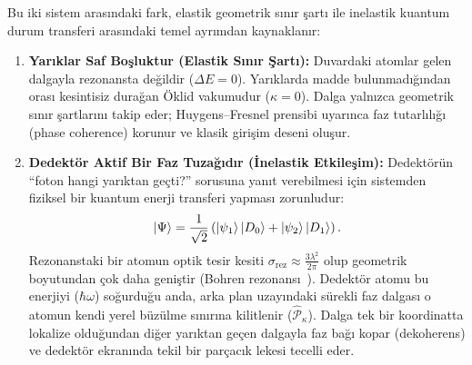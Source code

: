 \documentclass[11pt,a4paper]{article}
\begin{document}
Bu iki sistem arasındaki fark, elastik geometrik sınır şartı ile inelastik kuantum durum transferi arasındaki temel ayrımdan kaynaklanır:
\begin{enumerate}
    \item \textbf{Yarıklar Saf Boşluktur (Elastik Sınır Şartı):} Duvardaki atomlar gelen dalgayla rezonansta değildir ($\Delta E = 0$). Yarıklarda madde bulunmadığından orası kesintisiz durağan Öklid vakumudur ($\kappa = 0$). Dalga yalnızca geometrik sınır şartlarını takip eder; Huygens--Fresnel prensibi uyarınca faz tutarlılığı (phase coherence) korunur ve klasik girişim deseni oluşur.
    \item \textbf{Dedektör Aktif Bir Faz Tuzağıdır (İnelastik Etkileşim):} Dedektörün ``foton hangi yarıktan geçti?'' sorusuna yanıt verebilmesi için sistemden fiziksel bir kuantum enerji transferi yapması zorunludur:
          \begin{equation}
              \ket{\Psi} = \frac{1}{\sqrt{2}} \left( \ket{\psi_1}\ket{D_0} + \ket{\psi_2}\ket{D_1} \right).
              \label{eq:dolanik_olcum_em}
          \end{equation}
          Rezonanstaki bir atomun optik tesir kesiti $\sigma_{\mathrm{rez}} \approx \frac{3\lambda^2}{2\pi}$ olup geometrik boyutundan çok daha geniştir (Bohren rezonansı~\cite{bohren1983,paul1982}). Dedektör atomu bu enerjiyi ($\hbar\omega$) soğurduğu anda, arka plan uzayındaki sürekli faz dalgası o atomun kendi yerel büzülme sınırına kilitlenir ($\hat{\mathcal{P}}_\kappa$). Dalga tek bir koordinatta lokalize olduğundan diğer yarıktan geçen dalgayla faz bağı kopar (dekoherens) ve dedektör ekranında tekil bir parçacık lekesi tecelli eder.
\end{enumerate}
\end{document}
